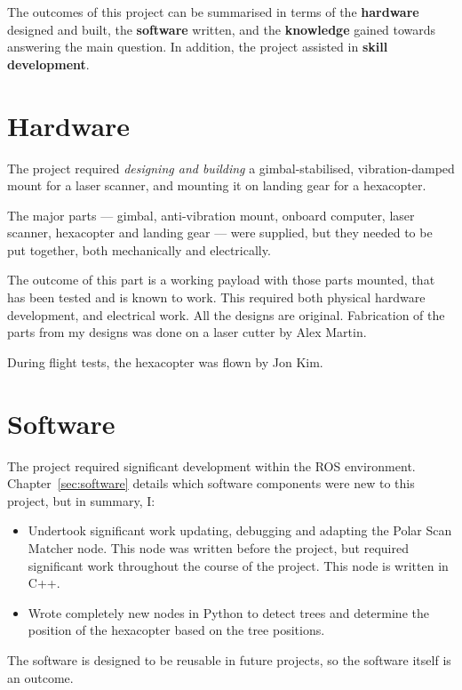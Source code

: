 \documentclass[12pt,oneside,a4paper]{book}
\begin{document}
The outcomes of this project can be summarised in terms of the
\textbf{hardware} designed and built, the \textbf{software} written,
and the \textbf{knowledge} gained towards answering the main
question. In addition, the project assisted in \textbf{skill
  development}.

\section{Hardware}
\label{sec:hardware-1}

The project required \emph{designing and building} a
gimbal-stabilised, vibration-damped mount for a laser scanner, and
mounting it on landing gear for a hexacopter.

The major parts --- gimbal, anti-vibration mount, onboard computer, laser
scanner, hexacopter and landing gear --- were supplied, but they needed
to be put together, both mechanically and electrically.

The outcome of this part is a working payload with those parts
mounted, that has been tested and is known to work. This required both
physical hardware development, and electrical work. All the designs
are original. Fabrication of the parts from my designs was done on a
laser cutter by Alex Martin.

During flight tests, the hexacopter was flown by Jon Kim.

\section{Software}
\label{sec:software-1}

The project required significant development within the ROS
environment. Chapter~\ref{sec:software} details which software
components were new to this project, but in summary, I:
\begin{itemize}
\item Undertook significant work updating, debugging and adapting the
  Polar Scan Matcher node. This node was written before the project,
  but required significant work throughout the course of the
  project. This node is written in C++.
\item Wrote completely new nodes in Python to detect trees and
  determine the position of the hexacopter based on the tree
  positions.
\end{itemize}

The software is designed to be reusable in future projects, so the
software itself is an outcome.
\end{document}
